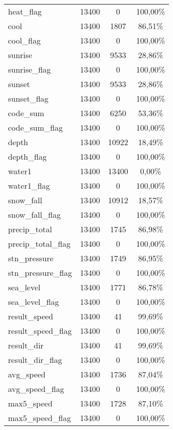 \begin{longtable}{lccc}
		heat\_flag			& 13400 & 0		     & 100,00\% 	\\	
		cool				& 13400 & 1807	     & 86,51\%  	\\
		cool\_flag			& 13400 & 0		     & 100,00\% 	\\	
		sunrise				& 13400 & 9533	     & 28,86\%  	\\
		sunrise\_flag		& 13400 & 0		     & 100,00\% 	\\	
		sunset				& 13400 & 9533	     & 28,86\%  	\\
		sunset\_flag		& 13400 & 0		     & 100,00\% 	\\	
		code\_sum			& 13400 & 6250	     & 53,36\%  	\\
		code\_sum\_flag		& 13400 & 0		     & 100,00\% 	\\	
		depth				& 13400 & 10922		 & 18,49\%  	\\
		depth\_flag			& 13400 & 0		   	 & 100,00\%		\\	
		water1				& 13400 & 13400		 & 0,00\%		\\
		water1\_flag		& 13400 & 0		   	 & 100,00\%		\\	
		snow\_fall			& 13400 & 10912		 & 18,57\%		\\	
		snow\_fall\_flag	& 13400 & 0		   	 & 100,00\%		\\		
		precip\_total		& 13400 & 1745		 & 86,98\%		\\	
		precip\_total\_flag	& 13400 & 0		   	 & 100,00\%		\\		
		stn\_pressure		& 13400 & 1749		 & 86,95\%		\\	
		stn\_pressure\_flag	& 13400 & 0		   	 & 100,00\%		\\		
		sea\_level			& 13400 & 1771		 & 86,78\%		\\	
		sea\_level\_flag	& 13400 & 0		   	 & 100,00\%		\\		
		result\_speed		& 13400 & 41		 & 99,69\%		\\	
		result\_speed\_flag	& 13400 & 0		   	 & 100,00\%		\\		
		result\_dir			& 13400 & 41		 & 99,69\%		\\			
		result\_dir\_flag	& 13400 & 0		   	 & 100,00\%		\\		
		avg\_speed			& 13400 & 1736		 & 87,04\%		\\	
		avg\_speed\_flag	& 13400 & 0		   	 & 100,00\%		\\		
		max5\_speed			& 13400 & 1728		 & 87,10\%		\\	
		max5\_speed\_flag	& 13400 & 0		   	 & 100,00\%		\\		

\end{longtable}

